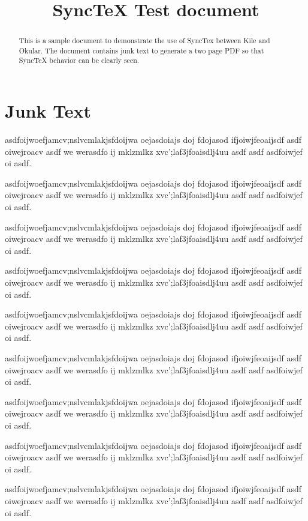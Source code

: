 \documentclass[a4paper,10pt]{article}
\title{SyncTeX Test document}
\begin{document}
\maketitle

\begin{abstract}
This is a sample document to demonstrate the use of SyncTex between Kile and Okular. 
The document contains junk text to generate a two page PDF so that SyncTeX behavior
can be clearly seen.
\end{abstract}

\section{Junk Text}
asdfoijwoefjamcv;nslvcmlakjsfdoijwa oejasdoiajs doj fdojasod ifjoiwjfeoaijsdf asdf 
oiwejroacv asdf we werasdfo ij mklzmlkz xvc';laf3jfoaisdlj4uu asdf asdf 
asdfoiwjef oi asdf.

asdfoijwoefjamcv;nslvcmlakjsfdoijwa oejasdoiajs doj fdojasod ifjoiwjfeoaijsdf asdf 
oiwejroacv asdf we werasdfo ij mklzmlkz xvc';laf3jfoaisdlj4uu asdf asdf 
asdfoiwjef oi asdf.

asdfoijwoefjamcv;nslvcmlakjsfdoijwa oejasdoiajs doj fdojasod ifjoiwjfeoaijsdf asdf 
oiwejroacv asdf we werasdfo ij mklzmlkz xvc';laf3jfoaisdlj4uu asdf asdf 
asdfoiwjef oi asdf.

asdfoijwoefjamcv;nslvcmlakjsfdoijwa oejasdoiajs doj fdojasod ifjoiwjfeoaijsdf asdf 
oiwejroacv asdf we werasdfo ij mklzmlkz xvc';laf3jfoaisdlj4uu asdf asdf 
asdfoiwjef oi asdf.

asdfoijwoefjamcv;nslvcmlakjsfdoijwa oejasdoiajs doj fdojasod ifjoiwjfeoaijsdf asdf 
oiwejroacv asdf we werasdfo ij mklzmlkz xvc';laf3jfoaisdlj4uu asdf asdf 
asdfoiwjef oi asdf.

asdfoijwoefjamcv;nslvcmlakjsfdoijwa oejasdoiajs doj fdojasod ifjoiwjfeoaijsdf asdf 
oiwejroacv asdf we werasdfo ij mklzmlkz xvc';laf3jfoaisdlj4uu asdf asdf 
asdfoiwjef oi asdf.

asdfoijwoefjamcv;nslvcmlakjsfdoijwa oejasdoiajs doj fdojasod ifjoiwjfeoaijsdf asdf 
oiwejroacv asdf we werasdfo ij mklzmlkz xvc';laf3jfoaisdlj4uu asdf asdf 
asdfoiwjef oi asdf.

asdfoijwoefjamcv;nslvcmlakjsfdoijwa oejasdoiajs doj fdojasod ifjoiwjfeoaijsdf asdf 
oiwejroacv asdf we werasdfo ij mklzmlkz xvc';laf3jfoaisdlj4uu asdf asdf 
asdfoiwjef oi asdf.

asdfoijwoefjamcv;nslvcmlakjsfdoijwa oejasdoiajs doj fdojasod ifjoiwjfeoaijsdf asdf 
oiwejroacv asdf we werasdfo ij mklzmlkz xvc';laf3jfoaisdlj4uu asdf asdf 
asdfoiwjef oi asdf.
\end{document}
